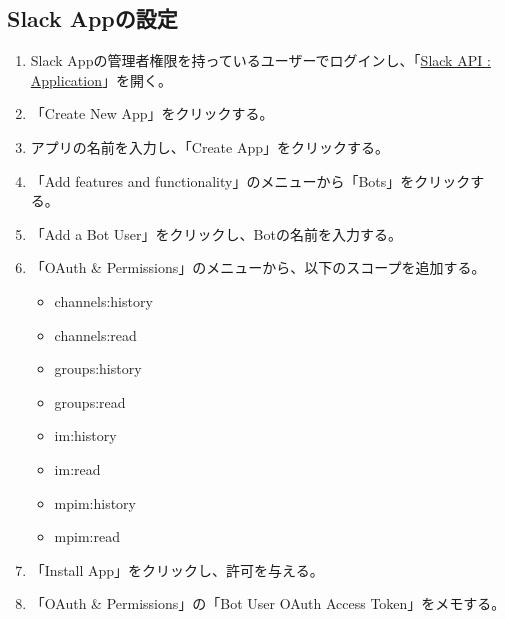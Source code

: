 \documentclass[a4j, 11pt, dvipdfmx]{jsarticle}
\begin{document}
\subsection{Slack Appの設定}
\begin{enumerate}
\item Slack Appの管理者権限を持っているユーザーでログインし、「\href{https://api.slack.com/apps}{Slack API : Application}」を開く。
\item 「Create New App」をクリックする。
\item アプリの名前を入力し、「Create App」をクリックする。
\item 「Add features and functionality」のメニューから「Bots」をクリックする。
\item 「Add a Bot User」をクリックし、Botの名前を入力する。
\item 「OAuth \& Permissions」のメニューから、以下のスコープを追加する。
\begin{itemize}
\item channels:history
\item channels:read
\item groups:history
\item groups:read
\item im:history
\item im:read
\item mpim:history
\item mpim:read
\end{itemize}
\item 「Install App」をクリックし、許可を与える。
\item 「OAuth \& Permissions」の「Bot User OAuth Access Token」をメモする。
\end{enumerate}
\end{document}
